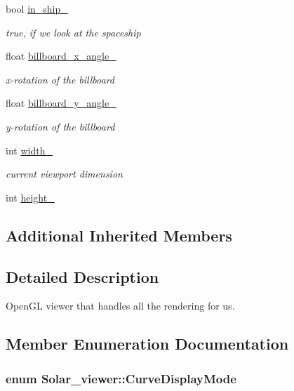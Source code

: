 \begin{DoxyCompactItemize}
bool \hyperlink{classSolar__viewer_a6bed73dabfc1ef5dbf51b1bf6b854a55}{in\+\_\+ship\+\_\+}
\begin{DoxyCompactList}\small\item\em true, if we look at the spaceship \end{DoxyCompactList}\item 
float \hyperlink{classSolar__viewer_adf92f5eeae577e1178a4e8216abb87bb}{billboard\+\_\+x\+\_\+angle\+\_\+}
\begin{DoxyCompactList}\small\item\em x-\/rotation of the billboard \end{DoxyCompactList}\item 
float \hyperlink{classSolar__viewer_af91dd8490128e7b955fee3a166db7c3f}{billboard\+\_\+y\+\_\+angle\+\_\+}
\begin{DoxyCompactList}\small\item\em y-\/rotation of the billboard \end{DoxyCompactList}\item 
int \hyperlink{classSolar__viewer_ad12592d718e123912365df3ef23a2dbb}{width\+\_\+}
\begin{DoxyCompactList}\small\item\em current viewport dimension \end{DoxyCompactList}\item 
int \hyperlink{classSolar__viewer_ae13eeec65d2a4ea4fda382687a4379cd}{height\+\_\+}
\end{DoxyCompactItemize}
\subsection*{Additional Inherited Members}


\subsection{Detailed Description}
Open\+GL viewer that handles all the rendering for us. 

\subsection{Member Enumeration Documentation}
\subsubsection[{\texorpdfstring{Curve\+Display\+Mode}{CurveDisplayMode}}]{\setlength{\rightskip}{0pt plus 5cm}enum {\bf Solar\+\_\+viewer\+::\+Curve\+Display\+Mode}\hspace{0.3cm}{\ttfamily [private]}}\hypertarget{classSolar__viewer_a81992414d6b7f79184b903adffca6d88}{}\label{classSolar__viewer_a81992414d6b7f79184b903adffca6d88}


